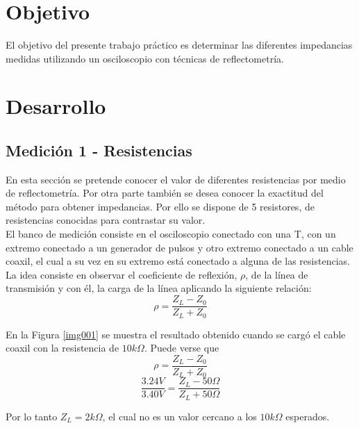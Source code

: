\documentclass[a4paper,10pt]{article}
\title{  }
\begin{document}
	\maketitle %
	\newpage

	\tableofcontents %
	\newpage


	\section{Objetivo}
	
	\indent	El objetivo del presente trabajo práctico es determinar las 
	diferentes impedancias medidas utilizando un osciloscopio con técnicas de 
	reflectometría.
	
	\newpage
	\section{Desarrollo}

	\subsection{Medición 1 - Resistencias}
	\indent En esta sección se pretende conocer el valor de diferentes 
	resistencias por medio de reflectometr\'ia. Por otra parte tambi\'en se 
	desea conocer la exactitud del m\'etodo para obtener impedancias. Por ello
	se dispone de 5 resistores, de resistencias conocidas para contrastar su 
	valor. \\
	\indent El banco de medición consiste en el osciloscopio conectado con una
	T, con un extremo conectado a un generador de pulsos y otro extremo 
	conectado a un cable coaxil, el cual a su vez en su extremo est\'a 
	conectado a alguna de las resistencias. La idea consiste en observar el 
	coeficiente de reflexión, $\rho$, de la l\'inea de transmisión y con \'el,
	la carga de la l\'inea aplicando la siguiente relaci\'on: 
	$$\rho=\frac{Z_L-Z_0}{Z_L+Z_0}$$
	
	\indent En la Figura \ref{img001} se muestra el resultado obtenido cuando 
	se carg\'o el cable coaxil con la resistencia de $10k\Omega$. Puede verse 
	que $$\rho=\frac{Z_L-Z_0}{Z_L+Z_0}$$
	$$\frac{3.24V}{3.40V}=\frac{Z_L- 50\Omega}{Z_L+50\Omega}$$
	
	\indent Por lo tanto $Z_L=2k\Omega$, el cual no es un valor cercano a los
	$10k\Omega$  esperados.\\
		
\end{document}
